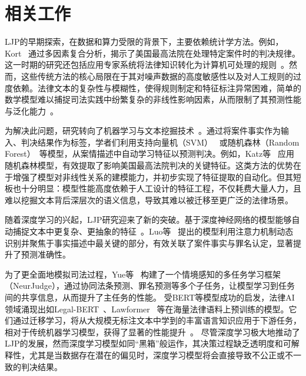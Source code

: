 \section{\heiti 相关工作}
LJP的早期探索，在数据和算力受限的背景下，主要依赖统计学方法。例如，Kort~\cite{kort1957predicting} 通过多因素复合分析，揭示了美国最高法院在处理特定案件时的判决规律。这一时期的研究还包括应用专家系统将法律知识转化为计算机可处理的规则~\cite{susskind1986expert}。然而，这些传统方法的核心局限在于其对噪声数据的高度敏感性以及对人工规则的过度依赖。法律文本的复杂性与模糊性，使得规则制定和特征标注异常困难，简单的数学模型难以捕捉司法实践中纷繁复杂的非线性影响因素，从而限制了其预测性能与泛化能力~\cite{deng2023syllogistic,dong2021legal}。

为解决此问题，研究转向了机器学习与文本挖掘技术~\cite{chen2013text,goncalves2005evaluating}。通过将案件事实作为输入、判决结果作为标签，学者们利用支持向量机（SVM）~\cite{kianmehr2006crime} 或随机森林（Random Forest）~\cite{sulea2017exploring}等模型，从案情描述中自动学习特征以预测判决。例如，Katz等~\cite{sulea2017exploring} 应用随机森林模型，有效提取了影响美国最高法院判决的关键特征。这类方法的优势在于增强了模型对非线性关系的建模能力，并初步实现了特征提取的自动化。但其短板也十分明显：模型性能高度依赖于人工设计的特征工程，不仅耗费大量人力，且难以挖掘文本背后深层次的语义信息，导致其难以被迁移至更广泛的法律场景。

随着深度学习的兴起，LJP研究迎来了新的突破。基于深度神经网络的模型能够自动捕捉文本中更复杂、更抽象的特征~\cite{cheng2025legal,feng2022legal,jiang2018interpretable,wang2019hierarchical}。Luo等~\cite{huang2019improved} 提出的模型利用注意力机制动态识别并聚焦于事实描述中最关键的部分，有效关联了案件事实与罪名认定，显著提升了预测准确性。

为了更全面地模拟司法过程，Yue等~\cite{yue2021neurjudge} 构建了一个情境感知的多任务学习框架（NeurJudge），通过协同法条预测、罪名预测等多个子任务，让模型学习到任务间的共享信息，从而提升了主任务的性能。
受BERT等模型成功的启发，法律AI领域涌现出如Legal-BERT~\cite{liu2021robustly,chalkidis2020legal,deepa2021bidirectional,devlin2019bert,fan2022multi}、Lawformer~\cite{xiao2021lawformer,du2022glm,fei2023lawbench,oana-maria2018e-snli} 等在海量法律语料上预训练的模型。它们通过迁移学习，将从大规模无标注文本中学到的丰富语言知识应用于下游任务，相对于传统机器学习模型，获得了显著的性能提升~\cite{cui2021pre,houlsby2019parameter,hu2018few,zhang2023contrastive}。
尽管深度学习极大地推动了LJP的发展，然而深度学习模型如同“黑箱”般运作，其决策过程缺乏透明度和可解释性，尤其是当数据存在潜在的偏见时，深度学习模型将会直接导致不公正或不一致的判决结果。

